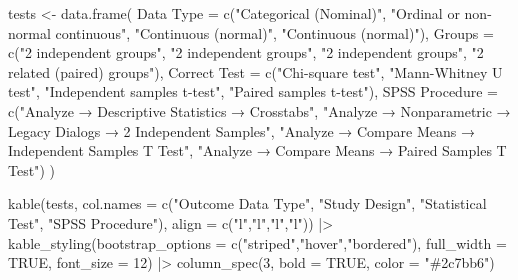 \documentclass[
  12pt,
  letterpaper,
]{book}
\newenvironment{Shaded}{\begin{snugshade}}{\end{snugshade}}
\newcommand{\AttributeTok}[1]{\textcolor[rgb]{0.40,0.45,0.13}{#1}}
\newcommand{\ConstantTok}[1]{\textcolor[rgb]{0.56,0.35,0.01}{#1}}
\newcommand{\DecValTok}[1]{\textcolor[rgb]{0.68,0.00,0.00}{#1}}
\newcommand{\FunctionTok}[1]{\textcolor[rgb]{0.28,0.35,0.67}{#1}}
\newcommand{\NormalTok}[1]{\textcolor[rgb]{0.00,0.23,0.31}{#1}}
\newcommand{\OtherTok}[1]{\textcolor[rgb]{0.00,0.23,0.31}{#1}}
\newcommand{\SpecialCharTok}[1]{\textcolor[rgb]{0.37,0.37,0.37}{#1}}
\newcommand{\StringTok}[1]{\textcolor[rgb]{0.13,0.47,0.30}{#1}}
\begin{document}
\begin{Shaded}
\begin{Highlighting}[]
\NormalTok{tests }\OtherTok{\textless{}{-}} \FunctionTok{data.frame}\NormalTok{(}
  \StringTok{\textasciigrave{}}\AttributeTok{Data Type}\StringTok{\textasciigrave{}} \OtherTok{=} \FunctionTok{c}\NormalTok{(}\StringTok{"Categorical (Nominal)"}\NormalTok{,}
                   \StringTok{"Ordinal or non{-}normal continuous"}\NormalTok{,}
                   \StringTok{"Continuous (normal)"}\NormalTok{,}
                   \StringTok{"Continuous (normal)"}\NormalTok{),}
  \StringTok{\textasciigrave{}}\AttributeTok{Groups}\StringTok{\textasciigrave{}} \OtherTok{=} \FunctionTok{c}\NormalTok{(}\StringTok{"2 independent groups"}\NormalTok{,}
                \StringTok{"2 independent groups"}\NormalTok{,}
                \StringTok{"2 independent groups"}\NormalTok{,}
                \StringTok{"2 related (paired) groups"}\NormalTok{),}
  \StringTok{\textasciigrave{}}\AttributeTok{Correct Test}\StringTok{\textasciigrave{}} \OtherTok{=} \FunctionTok{c}\NormalTok{(}\StringTok{"Chi{-}square test"}\NormalTok{,}
                      \StringTok{"Mann{-}Whitney U test"}\NormalTok{,}
                      \StringTok{"Independent samples t{-}test"}\NormalTok{,}
                      \StringTok{"Paired samples t{-}test"}\NormalTok{),}
  \StringTok{\textasciigrave{}}\AttributeTok{SPSS Procedure}\StringTok{\textasciigrave{}} \OtherTok{=} \FunctionTok{c}\NormalTok{(}\StringTok{"Analyze → Descriptive Statistics → Crosstabs"}\NormalTok{,}
                        \StringTok{"Analyze → Nonparametric → Legacy Dialogs → 2 Independent Samples"}\NormalTok{,}
                        \StringTok{"Analyze → Compare Means → Independent Samples T Test"}\NormalTok{,}
                        \StringTok{"Analyze → Compare Means → Paired Samples T Test"}\NormalTok{)}
\NormalTok{)}

\FunctionTok{kable}\NormalTok{(tests,}
      \AttributeTok{col.names =} \FunctionTok{c}\NormalTok{(}\StringTok{"Outcome Data Type"}\NormalTok{, }\StringTok{"Study Design"}\NormalTok{,}
                    \StringTok{"Statistical Test"}\NormalTok{, }\StringTok{"SPSS Procedure"}\NormalTok{),}
      \AttributeTok{align =} \FunctionTok{c}\NormalTok{(}\StringTok{"l"}\NormalTok{,}\StringTok{"l"}\NormalTok{,}\StringTok{"l"}\NormalTok{,}\StringTok{"l"}\NormalTok{)) }\SpecialCharTok{|\textgreater{}}
  \FunctionTok{kable\_styling}\NormalTok{(}\AttributeTok{bootstrap\_options =} \FunctionTok{c}\NormalTok{(}\StringTok{"striped"}\NormalTok{,}\StringTok{"hover"}\NormalTok{,}\StringTok{"bordered"}\NormalTok{),}
                \AttributeTok{full\_width =} \ConstantTok{TRUE}\NormalTok{, }\AttributeTok{font\_size =} \DecValTok{12}\NormalTok{) }\SpecialCharTok{|\textgreater{}}
  \FunctionTok{column\_spec}\NormalTok{(}\DecValTok{3}\NormalTok{, }\AttributeTok{bold =} \ConstantTok{TRUE}\NormalTok{, }\AttributeTok{color =} \StringTok{"\#2c7bb6"}\NormalTok{)}
\end{Highlighting}
\end{Shaded}
\end{document}
